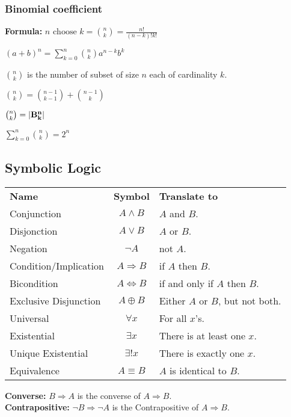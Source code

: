 \documentclass[5pt]{article}
\begin{document}
\begin{multicols}{2}
\subsubsection{Binomial coefficient}
\textbf{Formula:} $n \text{ choose } k=\binom{n}{k}=\frac{n!}{(n-k)!k!}$
\begin{theorem}
    $(a+b)^n=\sum^n_{k=0}\binom{n}{k}a^{n-k}b^k$
\end{theorem}
\begin{properties}
    \begin{itemize*}
        \item $\binom{n}{k}$ is the number of subset of size $n$ each of cardinality $k$.
        \item $\binom{n}{k}=\binom{n-1}{k-1}+\binom{n-1}{k}$
        \item $\binom{n}{k}=|\bf{B}^n_k|$
        \item $\sum_{k=0}^{n}\binom{n}{k}=2^n$
    \end{itemize*}
\end{properties}

\subsection{Symbolic Logic}
\begin{tabular}{lcl}
    \textbf{Name}           & \textbf{Symbol}               & \textbf{Translate to}\\
    Conjunction             & $A\land B$                    & $A$ and $B$.\\
    Disjonction             & $A\lor B$                     & $A$ or $B$.\\
    Negation                & $\lnot A$                     & not $A$.\\
    Condition/Implication   & $A\Rightarrow B$              & if $A$ then $B$.\\
    Bicondition             & $A\Leftrightarrow B$          & if and only if $A$ then $B$.\\
    Exclusive Disjunction   & $A\oplus B$                   & Either $A$ or $B$, but not both.\\
    Universal               & $\forall x$                   & For all $x$'s.\\
    Existential             & $\exists x$                   & There is at least one $x$.\\
    Unique Existential      & $\exists! x$                  & There is exactly one $x$.\\
    Equivalence             & $A\equiv B$                   & $A$ is identical to $B$.\\
\end{tabular}
\textbf{Converse:} $B\Rightarrow A$ is the converse of $A\Rightarrow B$.\\
\textbf{Contrapositive:} $\lnot B\Rightarrow \lnot A$ is the Contrapositive of $A\Rightarrow B$. 


\end{multicols}
\end{document}
